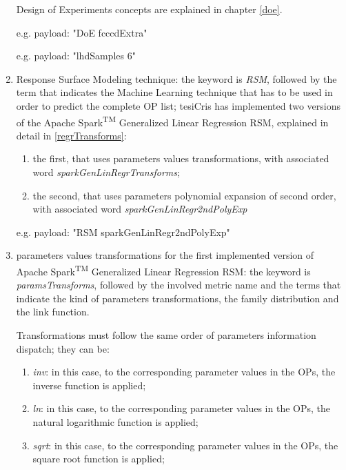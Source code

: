 \begin{enumerate}
    Design of Experiments concepts are explained in chapter \ref{doe}.
    
    e.g. payload: "DoE fcccdExtra"
    
    e.g. payload: "lhdSamples 6"
    
    \item Response Surface Modeling technique: the keyword is \textit{RSM}, followed by the term that indicates the Machine Learning technique that has to be used in order to predict the complete OP list; tesiCris has implemented two versions of the Apache Spark\textsuperscript{TM} Generalized Linear Regression RSM, explained in detail in \ref{regrTransforms}:
    
    \begin{enumerate}
    
        \item the first, that uses parameters values transformations, with associated word \textit{sparkGenLinRegrTransforms};
        
        \item the second, that uses parameters polynomial expansion of second order, with associated word \textit{sparkGenLinRegr2ndPolyExp}
    
    \end{enumerate}
    
    e.g. payload: "RSM sparkGenLinRegr2ndPolyExp"
    
    \item parameters values transformations for the first implemented version of Apache Spark\textsuperscript{TM} Generalized Linear Regression RSM: the keyword is \textit{paramsTransforms}, followed by the involved metric name and the terms that indicate the kind of parameters transformations, the family distribution and the link function.
    
    Transformations must follow the same order of parameters information dispatch; they can be:
    
    \begin{enumerate}
    
        \item \textit{inv}: in this case, to the corresponding parameter values in the OPs, the inverse function is applied;
        
        \item \textit{ln}: in this case, to the corresponding parameter values in the OPs, the natural logarithmic function is applied;
        
        \item \textit{sqrt}: in this case, to the corresponding parameter values in the OPs, the square root function is applied;
        

\end{enumerate}
\end{enumerate}
